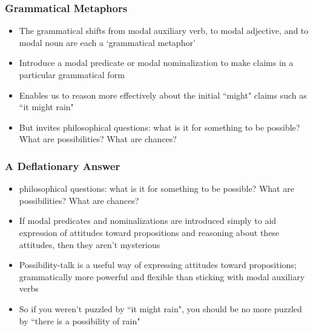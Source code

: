 \begin{frame}
\frametitle{Grammatical Metaphors}

\begin{itemize}[<+->]

\item The grammatical shifts from modal auxiliary verb, to modal adjective, and to modal noun are each a `grammatical metaphor'

\item Introduce a modal predicate or modal nominalization to make claims in a particular grammatical form

\item Enables us to reason more effectively about the initial ``might" claims such as ``it might rain"

\item But invites philosophical questions: what is it for something to be possible? What are possibilities? What are chances?

\end{itemize}
\end{frame}

\begin{frame}
\frametitle{A Deflationary Answer}

\begin{itemize}[<+->]

\item philosophical questions: what is it for something to be possible? What are possibilities? What are chances?

\item If modal predicates and nominalizations are introduced simply to aid expression of attitudes toward propositions and reasoning about these attitudes, then they aren't mysterious

\item Possibility-talk is a useful way of expressing attitudes toward propositions; grammatically more powerful and flexible than sticking with modal auxiliary verbs 

\item So if you weren't puzzled by ``it might rain", you should be no more puzzled by ``there is a possibility of rain"

\end{itemize}
\end{frame}

